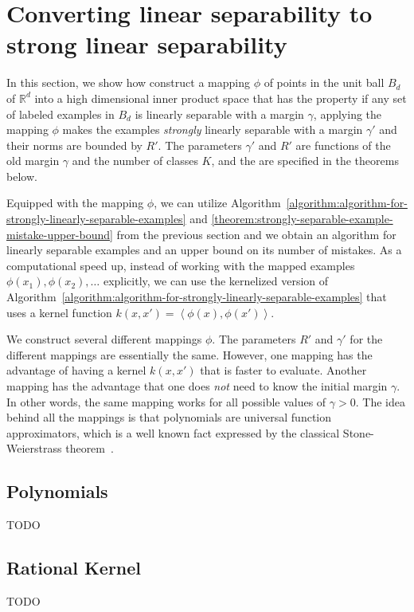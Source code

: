 \documentclass[12pt]{article}
\newcommand{\R}{\mathbb{R}}  %
\newcommand{\ip}[2]{\left\langle #1, #2 \right\rangle} %
\begin{document}
\section{Converting linear separability to strong linear separability}
\label{section:converting-linear-separability-to-strong-linear-separability}

In this section, we show how construct a mapping $\phi$ of points in the unit
ball $B_d$ of $\R^d$ into a high dimensional inner product space that has the
property if any set of labeled examples in $B_d$ is linearly separable with a
margin $\gamma$, applying the mapping $\phi$ makes the examples \emph{strongly}
linearly separable with a margin $\gamma'$ and their norms are bounded by $R'$.
The parameters $\gamma'$ and $R'$ are functions of the old margin $\gamma$ and
the number of classes $K$, and the are specified in the theorems below.

Equipped with the mapping $\phi$, we can utilize
Algorithm~\ref{algorithm:algorithm-for-strongly-linearly-separable-examples} and
\autoref{theorem:strongly-separable-example-mistake-upper-bound} from the
previous section and we obtain an algorithm for linearly separable examples and
an upper bound on its number of mistakes. As a computational speed up, instead
of working with the mapped examples $\phi(x_1), \phi(x_2), \dots$ explicitly, we
can use the kernelized version of
Algorithm~\ref{algorithm:algorithm-for-strongly-linearly-separable-examples}
that uses a kernel function $k(x,x') = \ip{\phi(x)}{\phi(x')}$.

We construct several different mappings $\phi$. The parameters $R'$ and
$\gamma'$ for the different mappings are essentially the same. However, one
mapping has the advantage of having a kernel $k(x,x')$ that is faster to
evaluate. Another mapping has the advantage that one does \emph{not} need to
know the initial margin $\gamma$. In other words, the same mapping works for all
possible values of $\gamma > 0$. The idea behind all the mappings is that
polynomials are universal function approximators, which is a well known fact
expressed by the classical Stone-Weierstrass theorem~\citep[page 159]{Rudin-1976}.

\subsection{Polynomials}
TODO

\subsection{Rational Kernel}
TODO
\end{document}
